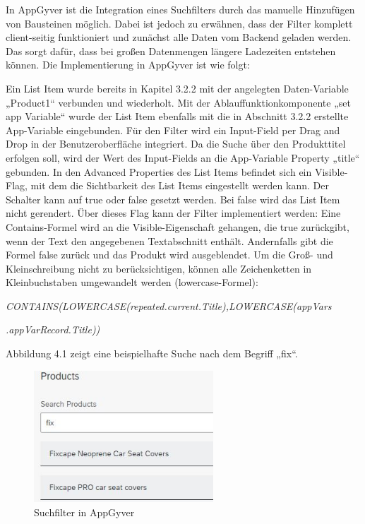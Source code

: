 In AppGyver ist die Integration eines Suchfilters durch das manuelle Hinzufügen von Bausteinen möglich. Dabei ist jedoch zu erwähnen, dass der Filter komplett client-seitig funktioniert und zunächst alle Daten vom Backend geladen werden. Das sorgt dafür, dass bei großen Datenmengen längere Ladezeiten entstehen können. Die Implementierung in AppGyver ist wie folgt:

Ein List Item wurde bereits in Kapitel 3.2.2 mit der angelegten Daten-Variable „Product1“ verbunden und wiederholt. Mit der Ablauffunktionkomponente „set app Variable“ wurde der List Item ebenfalls mit die in Abschnitt 3.2.2 erstellte App-Variable eingebunden. Für den Filter wird ein Input-Field per Drag and Drop in der Benutzeroberfläche integriert. Da die Suche über den Produkttitel erfolgen soll, wird der Wert des Input-Fields an die App-Variable Property „title“ gebunden. In den Advanced Properties des List Items befindet sich ein Visible-Flag, mit dem die Sichtbarkeit des List Items eingestellt werden kann. Der Schalter kann auf true oder false gesetzt werden. Bei false wird das List Item nicht gerendert. Über dieses Flag kann der Filter implementiert werden: Eine Contains-Formel wird an die Visible-Eigenschaft gehangen, die true zurückgibt, wenn der Text den angegebenen Textabschnitt enthält. Andernfalls gibt die Formel false zurück und das Produkt wird ausgeblendet. Um die Groß- und Kleinschreibung nicht zu berücksichtigen, können alle Zeichenketten in Kleinbuchstaben umgewandelt werden (lowercase-Formel):

\textit{CONTAINS(LOWERCASE(repeated.current.Title),LOWERCASE(appVars}

\textit{.appVarRecord.Title))}

Abbildung 4.1 zeigt eine beispielhafte  Suche nach dem Begriff „fix“.

\begin{figure}[htbp]
 \centering
 \includegraphics[width=0.6\textwidth]{Bilder/appgyver/4_1_Suchfilter_in_AppGyver.jpg}
 \caption{Suchfilter in AppGyver}
\end{figure}

